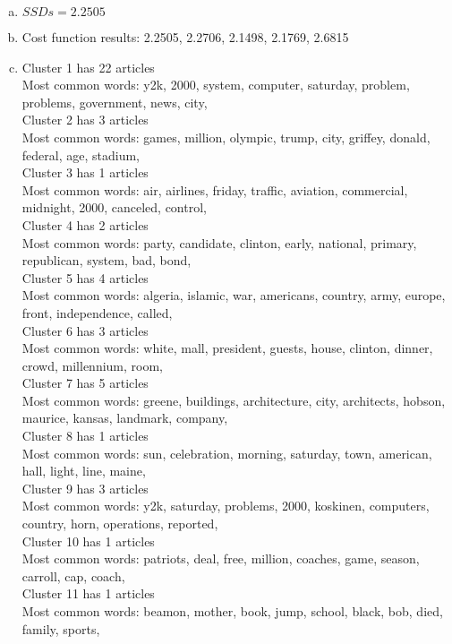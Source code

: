 \documentclass[twoside,11pt]{article}
\theoremstyle{definition}
\begin{document}
\begin{enumerate}[(a)]
\item $SSDs = 2.2505$
\item Cost function results: 2.2505, 2.2706, 2.1498, 2.1769, 2.6815 \\

\item
Cluster 1 has 22 articles \\
Most common words: y2k, 2000, system, computer, saturday, problem, problems, government, news, city, \\
Cluster 2 has 3 articles \\
Most common words: games, million, olympic, trump, city, griffey, donald, federal, age, stadium, \\
Cluster 3 has 1 articles \\
Most common words: air, airlines, friday, traffic, aviation, commercial, midnight, 2000, canceled, control, \\
Cluster 4 has 2 articles \\
Most common words: party, candidate, clinton, early, national, primary, republican, system, bad, bond, \\
Cluster 5 has 4 articles \\
Most common words: algeria, islamic, war, americans, country, army, europe, front, independence, called, \\
Cluster 6 has 3 articles \\
Most common words: white, mall, president, guests, house, clinton, dinner, crowd, millennium, room, \\
Cluster 7 has 5 articles \\
Most common words: greene, buildings, architecture, city, architects, hobson, maurice, kansas, landmark, company, \\
Cluster 8 has 1 articles \\
Most common words: sun, celebration, morning, saturday, town, american, hall, light, line, maine, \\
Cluster 9 has 3 articles \\
Most common words: y2k, saturday, problems, 2000, koskinen, computers, country, horn, operations, reported, \\
Cluster 10 has 1 articles \\
Most common words: patriots, deal, free, million, coaches, game, season, carroll, cap, coach, \\
Cluster 11 has 1 articles \\
Most common words: beamon, mother, book, jump, school, black, bob, died, family, sports, \\

\end{enumerate}
\end{document}
